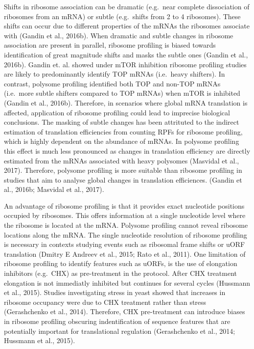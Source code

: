 \documentclass[12pt,openany]{book}
\begin{document}
Shifts in ribosome association can be dramatic (e.g.~near complete
dissociation of ribosomes from an mRNA) or subtle (e.g.~shifts from 2 to
4 ribosomes). These shifts can occur due to different properties of the
mRNAs the ribosomes associate with (Gandin et al., 2016b). When dramatic
and subtle changes in ribosome association are present in parallel,
ribosome profiling is biased towards identification of great magnitude
shifts and masks the subtle ones (Gandin et al., 2016b). Gandin et. al.
showed under mTOR inhibition ribosome profiling studies are likely to
predominantly identify TOP mRNAs (i.e.~heavy shifters). In contrast,
polysome profiling identified both TOP and non-TOP mRNAs (i.e.~more
subtle shifters compared to TOP mRNAs) when mTOR is inhibited (Gandin et
al., 2016b). Therefore, in scenarios where global mRNA translation is
affected, application of ribosome profiling could lead to imprecise
biological conclusions. The masking of subtle changes has been
attrituted to the indirect estimation of translation efficiencies from
counting RPFs for ribosome profiling, which is highly dependent on the
abundance of mRNAs. In polysome profiling this effect is much less
pronounced as changes in translation efficiency are directly estimated
from the mRNAs associated with heavy polysomes (Masvidal et al., 2017).
Therefore, polysome profiling is more suitable than ribosome profiling
in studies that aim to analyse global changes in translation
efficiences. (Gandin et al., 2016b; Masvidal et al., 2017).

An advantage of ribosome profiling is that it provides exact nucleotide
positions occupied by ribosomes. This offers information at a single
nucleotide level where the ribosome is located at the mRNA. Polysome
profiling cannot reveal ribosome locations along the mRNA. The single
nucleotide resolution of ribosome profiling is necessary in contexts
studying events such as ribosomal frame shifts or uORF translation
(Dmitry E Andreev et al., 2015; Rato et al., 2011). One limitation of
ribosome profiling to identify features such as uORFs, is the use of
elongation inhibitors (e.g.~CHX) as pre-treatment in the protocol. After
CHX treatment elongation is not immediatly inhibited but continues for
several cycles (Hussmann et al., 2015). Studies investigating stress in
yeast showed that increases in ribosome occupancy were due to CHX
treatment rather than stress (Gerashchenko et al., 2014). Therefore, CHX
pre-treatment can introduce biases in ribosome profiling obscuring
indentification of sequence features that are potentially important for
translational regulation (Gerashchenko et al., 2014; Hussmann et al.,
2015).
\end{document}
